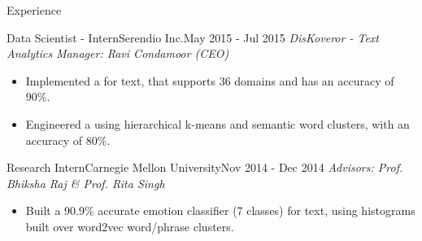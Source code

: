 \documentclass[]{mcdowellcv}
\begin{document}
\begin{cvsection}{Experience}
		\begin{cvsubsection}{Data Scientist - Intern}{Serendio Inc.}{May 2015 - Jul 2015}
		    \textit{DisKoveror - Text Analytics} \hfill \textit{Manager: Ravi Condamoor (CEO)}
			\begin{itemize}
            	\item Implemented a \href{https://github.com/tpsatish95/Universal-MultiDomain-Sentiment-Classifier}{} for text, that supports 36 domains and has an accuracy of 90\%.
                \item Engineered a \href{https://github.com/tpsatish95/Topic-Modeling-Social-Network-Text-Data}{} using hierarchical k-means and semantic word clusters, with an accuracy of 80\%.
			\end{itemize}
		\end{cvsubsection}

		\begin{cvsubsection}{Research Intern}{Carnegie Mellon University}{Nov 2014 - Dec 2014}
		    \textit{\href{https://github.com/tpsatish95/emotion-detection-from-text}{\color{blue!70}{Text-based Emotion Recognition System}}} \hfill \textit{Advisors: Prof. Bhiksha Raj \& Prof. Rita Singh}
			\begin{itemize}
			    \item Built a 90.9\% accurate emotion classifier (7 classes) for text, using histograms built over word2vec word/phrase clusters.
			\end{itemize}
		\end{cvsubsection}
	\end{cvsection}
\end{document}

